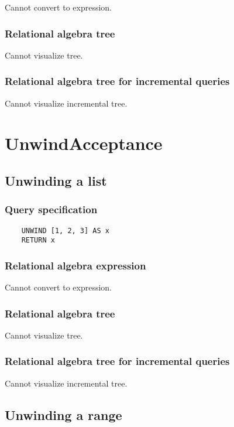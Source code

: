 	Cannot convert to expression.

	\subsubsection*{Relational algebra tree}

	Cannot visualize tree.

	\subsubsection*{Relational algebra tree for incremental queries}

	Cannot visualize incremental tree.

	\section{UnwindAcceptance}

	\subsection{Unwinding a list}

	\subsubsection*{Query specification}

	\begin{lstlisting}
	UNWIND [1, 2, 3] AS x
	RETURN x
	\end{lstlisting}


	\subsubsection*{Relational algebra expression}

	Cannot convert to expression.

	\subsubsection*{Relational algebra tree}

	Cannot visualize tree.

	\subsubsection*{Relational algebra tree for incremental queries}

	Cannot visualize incremental tree.
	\subsection{Unwinding a range}

